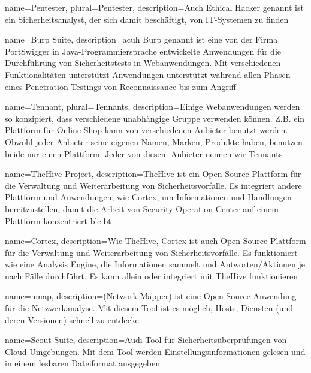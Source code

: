  {
    name={Pentester},
    plural={Pentester},
    description={Auch Ethical Hacker genannt ist ein Sicherheitsanalyst, der sich damit beschäftigt,   von IT-Systemen zu finden \citep{pentester}}   
}

 {
    name={Burp Suite},
    description={acuh Burp genannt ist eine von der Firma PortSwigger in Java-Programmiersprache entwickelte Anwendungen für die Durchführung von Sicherheitstests in Webanwendungen. Mit verschiedenen Funktionalitäten unterstützt Anwendungen unterstützt während allen Phasen eines Penetration Testings von Reconnaissance bis zum Angriff \citep{burp}}   
}

 {
    name={Tennant},
    plural={Tennants},
    description={Einige Webanwendungen werden so konzipiert, dass verschiedene unabhängige Gruppe verwenden können. Z.B. ein Plattform für Online-Shop kann von verschiedenen Anbieter benutzt werden. Obwohl jeder Anbieter seine eigenen Namen, Marken, Produkte haben, benutzen beide nur einen Plattform. Jeder von diesem Anbieter nennen wir Tennants}   
}

 {
    name={TheHive Project},
    description={TheHive ist ein Open Source Plattform für die Verwaltung und Weiterarbeitung von Sicherheitsvorfälle. Es integriert andere Plattform und Anwendungen, wie Cortex, um Informationen und Handlungen bereitzustellen, damit die Arbeit von Security Operation Center auf einem Plattform konzentriert bleibt \citep{TheHive}}   
}

 {
    name={Cortex},
    description={Wie \gls{TheHive}, Cortex ist auch Open Source Plattform für die Verwaltung und Weiterarbeitung von Sicherheitsvorfälle. Es funktioniert wie eine Analysis Engine, die Informationen sammelt und Antworten/Aktionen je nach Fälle durchführt. Es kann allein oder integriert mit TheHive funktionieren \citep{TheHive}}   
}

 {
    name={nmap},
    description={(Network Mapper) ist eine Open-Source Anwendung für die Netzwerkanalyse. Mit diesem Tool ist es möglich, Hosts, Diensten (und deren Versionen) schnell
    zu entdecke\citep{nmap}}    
}

 {
    name={Scout Suite},
    description={Audi-Tool für Sicherheitsüberprüfungen von Cloud-Umgebungen. Mit dem Tool werden Einstellungsinformationen gelesen und in einem lesbaren Dateiformat ausgegeben \citep{scoutsuite}}   
}


